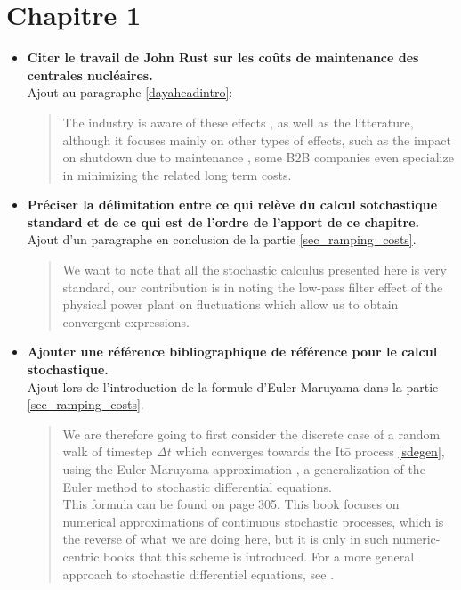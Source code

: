 \documentclass{article}
\begin{document}
\section{Chapitre 1}
\begin{itemize}
\item \textbf{Citer le travail de John Rust sur les coûts de maintenance des centrales nucléaires.}\\

Ajout au paragraphe \ref{dayaheadintro}:

\begin{quote}
The industry is aware of these effects \cite{GE}, as well as the litterature, although it focuses mainly on other types of effects, such as the impact on shutdown due to maintenance \cite{rothwell1995dynamic}, some B2B companies even specialize in minimizing the related long term costs.
\end{quote}

\item \textbf{Préciser la délimitation entre ce qui relève du calcul sotchastique standard et de ce qui est de l'ordre de l'apport de ce chapitre.}\\

Ajout d'un paragraphe en conclusion de la partie \ref{sec_ramping_costs}.

\begin{quote}
We want to note that all the stochastic calculus presented here is very standard, our contribution is in noting the low-pass filter effect of the physical power plant on fluctuations which allow us to obtain convergent expressions.
\end{quote}

\item \textbf{Ajouter une référence bibliographique de référence pour le calcul stochastique.}\\

Ajout lors de l'introduction de la formule d'Euler Maruyama dans la partie \ref{sec_ramping_costs}.
\begin{quote}
We are therefore going to first consider the discrete case of a random walk of timestep $\Delta t$ which converges towards the It\={o} process \ref{sdegen}, using the Euler-Maruyama approximation \cite{kloeden2011numerical}, a generalization of the Euler method to stochastic differential equations. \\

This formula can be found on page 305. This book focuses on numerical approximations of continuous stochastic processes, which is the reverse of what we are doing here, but it is only in such numeric-centric books that this scheme is introduced. For a more general approach to stochastic differentiel equations, see \cite{oksendal2003stochastic}.
\end{quote}


\end{itemize}
\end{document}

